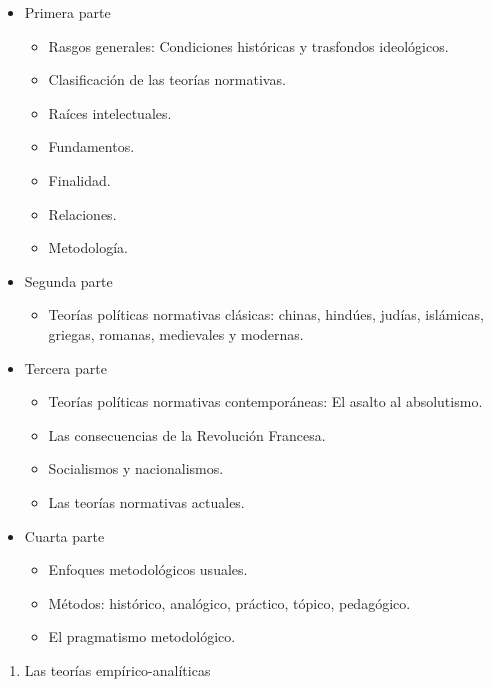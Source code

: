 \documentclass[
]{book}
\providecommand{\tightlist}{%
  \setlength{\itemsep}{0pt}\setlength{\parskip}{0pt}}
\begin{document}
\begin{itemize}
\tightlist
\item
  Primera parte

  \begin{itemize}
  \tightlist
  \item
    Rasgos generales: Condiciones históricas y trasfondos ideológicos.
  \item
    Clasificación de las teorías normativas.
  \item
    Raíces intelectuales.
  \item
    Fundamentos.
  \item
    Finalidad.
  \item
    Relaciones.
  \item
    Metodología.
  \end{itemize}
\item
  Segunda parte

  \begin{itemize}
  \tightlist
  \item
    Teorías políticas normativas clásicas: chinas, hindúes, judías, islámicas, griegas, romanas, medievales y modernas.
  \end{itemize}
\item
  Tercera parte

  \begin{itemize}
  \tightlist
  \item
    Teorías políticas normativas contemporáneas: El asalto al absolutismo.
  \item
    Las consecuencias de la Revolución Francesa.
  \item
    Socialismos y nacionalismos.
  \item
    Las teorías normativas actuales.
  \end{itemize}
\item
  Cuarta parte

  \begin{itemize}
  \tightlist
  \item
    Enfoques metodológicos usuales.
  \item
    Métodos: histórico, analógico, práctico, tópico, pedagógico.
  \item
    El pragmatismo metodológico.
  \end{itemize}
\end{itemize}

\begin{enumerate}
\def\labelenumi{\arabic{enumi}.}
\setcounter{enumi}{3}
\tightlist
\item
  Las teorías empírico-analíticas
\end{enumerate}
\end{document}
